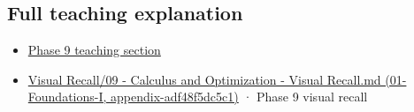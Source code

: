 \subsection{Full teaching explanation}\label{full-teaching-explanation}

\begin{itemize}
\tightlist
\item
  \href{Continuous\%20Notes/Computing\%20Foundations\%20-\%20From\%20Bits\%20to\%20C++\%20and\%20Systems\%20APIs\#Jacobians,\%20curvature,\%20and\%20local\%20approximation}{Phase 9 teaching section}
\item
  \href{}{Visual Recall/09 - Calculus and Optimization - Visual Recall.md (01-Foundations-I, appendix-adf48f5dc5c1)} · Phase 9 visual recall
\end{itemize}

